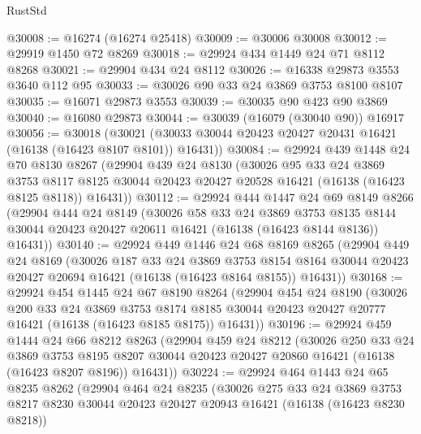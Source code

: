 \begin{lexlean}{RustStd}
\begin{coremodule}
@30008 := @16274 (@16274 @25418)
@30009 := @30006 @30008
@30012 := @29919 @1450 @72 @8269
@30018 := @29924 @434 @1449 @24 @71 @8112 @8268
@30021 := @29904 @434 @24 @8112
@30026 := @16338 @29873 @3553 @3640 @112 @95
@30033 := @30026 @90 @33 @24 @3869 @3753 @8100 @8107
@30035 := @16071 @29873 @3553
@30039 := @30035 @90 @423 @90 @3869
@30040 := @16080 @29873
@30044 := @30039 (@16079 (@30040 @90)) @16917
@30056 := @30018
    (@30021 (@30033 @30044 @20423 @20427 @20431 @16421 (@16138 (@16423 @8107 @8101)) @16431))
@30084 := @29924
    @439
    @1448
    @24
    @70
    @8130
    @8267
    (@29904
      @439
      @24
      @8130
      (@30026
        @95
        @33
        @24
        @3869
        @3753
        @8117
        @8125
        @30044
        @20423
        @20427
        @20528
        @16421
        (@16138 (@16423 @8125 @8118))
        @16431))
@30112 := @29924
    @444
    @1447
    @24
    @69
    @8149
    @8266
    (@29904
      @444
      @24
      @8149
      (@30026
        @58
        @33
        @24
        @3869
        @3753
        @8135
        @8144
        @30044
        @20423
        @20427
        @20611
        @16421
        (@16138 (@16423 @8144 @8136))
        @16431))
@30140 := @29924
    @449
    @1446
    @24
    @68
    @8169
    @8265
    (@29904
      @449
      @24
      @8169
      (@30026
        @187
        @33
        @24
        @3869
        @3753
        @8154
        @8164
        @30044
        @20423
        @20427
        @20694
        @16421
        (@16138 (@16423 @8164 @8155))
        @16431))
@30168 := @29924
    @454
    @1445
    @24
    @67
    @8190
    @8264
    (@29904
      @454
      @24
      @8190
      (@30026
        @200
        @33
        @24
        @3869
        @3753
        @8174
        @8185
        @30044
        @20423
        @20427
        @20777
        @16421
        (@16138 (@16423 @8185 @8175))
        @16431))
@30196 := @29924
    @459
    @1444
    @24
    @66
    @8212
    @8263
    (@29904
      @459
      @24
      @8212
      (@30026
        @250
        @33
        @24
        @3869
        @3753
        @8195
        @8207
        @30044
        @20423
        @20427
        @20860
        @16421
        (@16138 (@16423 @8207 @8196))
        @16431))
@30224 := @29924
    @464
    @1443
    @24
    @65
    @8235
    @8262
    (@29904
      @464
      @24
      @8235
      (@30026
        @275
        @33
        @24
        @3869
        @3753
        @8217
        @8230
        @30044
        @20423
        @20427
        @20943
        @16421
        (@16138 (@16423 @8230 @8218))

\end{coremodule}
\end{lexlean}
